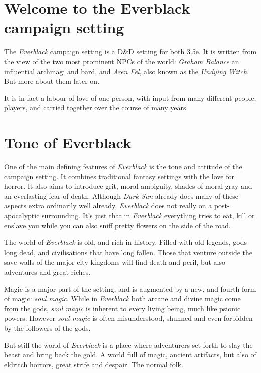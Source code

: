 \twocolumn
\section*{Welcome to the Everblack campaign setting}

The \emph{Everblack} campaign setting is a D\&D setting for both 3.5e.
It is written from the view of the two most prominent NPCs of the world:
\emph{Graham Balance} an influential archmagi and bard, and \emph{Aren Fel},
also known as the \emph{Undying Witch}. But more about them later on.

It is in fact a labour of love of one person, with input from many different
people, players, and carried together over the course of many years.

\section*{Tone of Everblack}

One of the main defining features of \emph{Everblack} is the tone and attitude
of the campaign setting. It combines traditional fantasy settings with the love
for horror. It also aims to introduce grit, moral ambiguity, shades of moral
gray and an everlasting fear of death. Although \emph{Dark Sun} already does
many of these aspects extra ordinarily well already, \emph{Everblack} does not
really on a post-apocalyptic surrounding. It's just that in \emph{Everblack}
everything tries to eat, kill or enslave you while you can also sniff pretty
flowers on the side of the road.

The world of \emph{Everblack} is old, and rich in history. Filled with old
legends, gods long dead, and civilisations that have long fallen. Those that
venture outside the save walls of the major city kingdoms will find death and
peril, but also adventures and great riches.

Magic is a major part of the setting, and is augmented by a new, and fourth
form of magic: \emph{soul magic}. While in \emph{Everblack} both arcane and
divine magic come from the gods, \emph{soul magic} is inherent to every living
being, much like psionic powers. However \emph{soul magic} is often
misunderstood, shunned and even forbidden by the followers of the gods.

But still the world of \emph{Everblack} is a place where adventurers set forth
to slay the beast and bring back the gold. A world full of magic, ancient
artifacts, but also of eldritch horrors, great strife and despair. The normal
folk.

